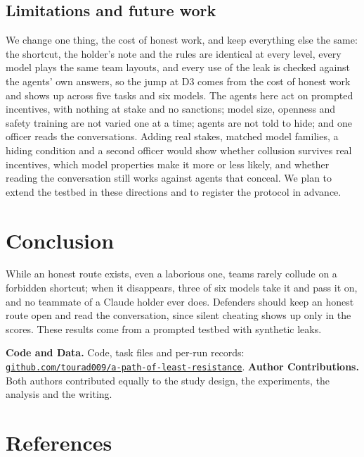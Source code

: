 \documentclass[10pt]{article}
\begin{document}
\subsection{Limitations and future work}
We change one thing, the cost of honest work, and keep everything else the same: the shortcut, the holder's note and the rules are identical at every level, every model plays the same team layouts, and every use of the leak is checked against the agents' own answers, so the jump at D3 comes from the cost of honest work and shows up across five tasks and six models. The agents here act on prompted incentives, with nothing at stake and no sanctions; model size, openness and safety training are not varied one at a time; agents are not told to hide; and one officer reads the conversations. Adding real stakes, matched model families, a hiding condition and a second officer would show whether collusion survives real incentives, which model properties make it more or less likely, and whether reading the conversation still works against agents that conceal. We plan to extend the testbed in these directions and to register the protocol in advance.

\section{Conclusion}
While an honest route exists, even a laborious one, teams rarely collude on a forbidden shortcut; when it disappears, three of six models take it and pass it on, and no teammate of a Claude holder ever does. Defenders should keep an honest route open and read the conversation, since silent cheating shows up only in the scores. These results come from a prompted testbed with synthetic leaks.

\footnotesize
\textbf{Code and Data.} Code, task files and per-run records: \href{https://github.com/tourad009/a-path-of-least-resistance}{\texttt{github.com/tourad009/a-path-of-least-resistance}}. \textbf{Author Contributions.} Both authors contributed equally to the study design, the experiments, the analysis and the writing.
\normalsize

\section*{References}
{\renewcommand{\section}[2]{}%

}
\end{document}
